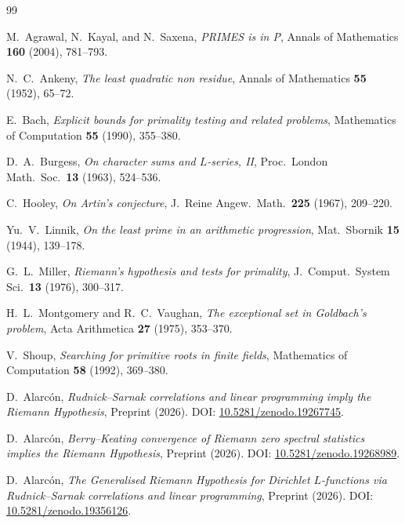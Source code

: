 \documentclass[11pt]{article}
\theoremstyle{plain}
\theoremstyle{definition}
\theoremstyle{remark}
\begin{document}
\begin{thebibliography}{99}

M.~Agrawal, N.~Kayal, and N.~Saxena,
\emph{PRIMES is in P},
Annals of Mathematics \textbf{160} (2004), 781--793.

N.~C.~Ankeny,
\emph{The least quadratic non residue},
Annals of Mathematics \textbf{55} (1952), 65--72.

E.~Bach,
\emph{Explicit bounds for primality testing and related problems},
Mathematics of Computation \textbf{55} (1990), 355--380.

D.~A.~Burgess,
\emph{On character sums and $L$-series, II},
Proc.\ London Math.\ Soc.\ \textbf{13} (1963), 524--536.

C.~Hooley,
\emph{On Artin's conjecture},
J.\ Reine Angew.\ Math.\ \textbf{225} (1967), 209--220.

Yu.~V.~Linnik,
\emph{On the least prime in an arithmetic progression},
Mat.\ Sbornik \textbf{15} (1944), 139--178.

G.~L.~Miller,
\emph{Riemann's hypothesis and tests for primality},
J.\ Comput.\ System Sci.\ \textbf{13} (1976), 300--317.

H.~L.~Montgomery and R.~C.~Vaughan,
\emph{The exceptional set in Goldbach's problem},
Acta Arithmetica \textbf{27} (1975), 353--370.

V.~Shoup,
\emph{Searching for primitive roots in finite fields},
Mathematics of Computation \textbf{58} (1992), 369--380.

D.~Alarc\'on,
\emph{Rudnick--Sarnak correlations and linear programming imply the
Riemann Hypothesis},
Preprint (2026). DOI: \href{https://doi.org/10.5281/zenodo.19267745}{10.5281/zenodo.19267745}.

D.~Alarc\'on,
\emph{Berry--Keating convergence of Riemann zero spectral statistics
implies the Riemann Hypothesis},
Preprint (2026). DOI: \href{https://doi.org/10.5281/zenodo.19268989}{10.5281/zenodo.19268989}.

D.~Alarc\'on,
\emph{The Generalised Riemann Hypothesis for Dirichlet $L$-functions
via Rudnick--Sarnak correlations and linear programming},
Preprint (2026). DOI: \href{https://doi.org/10.5281/zenodo.19356126}{10.5281/zenodo.19356126}.

\end{thebibliography}
\end{document}
